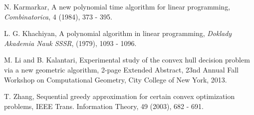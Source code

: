 \documentclass{article}
\theoremstyle{definition}
\begin{document}
\begin{thebibliography}{9}
 N. Karmarkar,  A new polynomial time algorithm for linear programming, {\it Combinatorica}, 4 (1984),  373 - 395. \filbreak


 L. G. Khachiyan, A polynomial algorithm in linear programming, {\it Doklady Akademia Nauk SSSR},
(1979), 1093 - 1096.\filbreak


 M. Li and B. Kalantari, Experimental study of the convex hull decision problem via a new geometric algorithm, 2-page Extended Abstract, 23nd Annual Fall Workshop on Computational Geometry, City College of New York, 2013. \filbreak

   T. Zhang, Sequential greedy approximation for certain convex optimization problems, IEEE Trans. Information Theory, 49 (2003), 682 - 691. \filbreak

\end{thebibliography}

\bigskip
\end{document}
